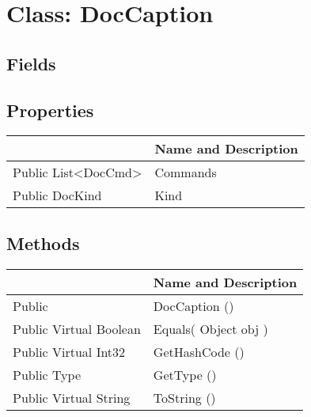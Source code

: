 \documentclass[11pt, oneside, a4paper]{book}
\begin{document}
\hypertarget{SoftwareEngineeringTools.{}Documentation.{}DocCaption}{}
\section{Class: DocCaption}

\subsection{Fields}

\subsection{Properties}
\begin{center}
\begin{tabular}{| p{3cm} | p{12cm} | }
\hline
\textbf{ } & \textbf{ Name and Description}\\
\hline
 Public  List<DocCmd> &  Commands\hypertarget{SoftwareEngineeringTools.{}Documentation.{}DocCaption.{}Commands}{}\\
\hline
 Public  DocKind &  Kind\hypertarget{SoftwareEngineeringTools.{}Documentation.{}DocCaption.{}Kind}{}\\
\hline
\end{tabular}
\end{center}

\subsection{Methods}
\begin{center}
\begin{tabular}{| p{3cm} | p{12cm} | }
\hline
\textbf{ } & \textbf{ Name and Description}\\
\hline
 Public  &  DocCaption ()\hypertarget{SoftwareEngineeringTools.{}Documentation.{}DocCaption.{}DocCaption}{}\\
\hline
 Public  Virtual  Boolean &  Equals(\hypertarget{SoftwareEngineeringTools.{}Documentation.{}DocCaption.{}Equals\_Object}{} Object  obj  )\\
\hline
 Public  Virtual  Int32 &  GetHashCode ()\hypertarget{SoftwareEngineeringTools.{}Documentation.{}DocCaption.{}GetHashCode}{}\\
\hline
 Public  Type &  GetType ()\hypertarget{SoftwareEngineeringTools.{}Documentation.{}DocCaption.{}GetType}{}\\
\hline
 Public  Virtual  String &  ToString ()\hypertarget{SoftwareEngineeringTools.{}Documentation.{}DocCaption.{}ToString}{}\\
\hline
\end{tabular}
\end{center}
 
\end{document}
